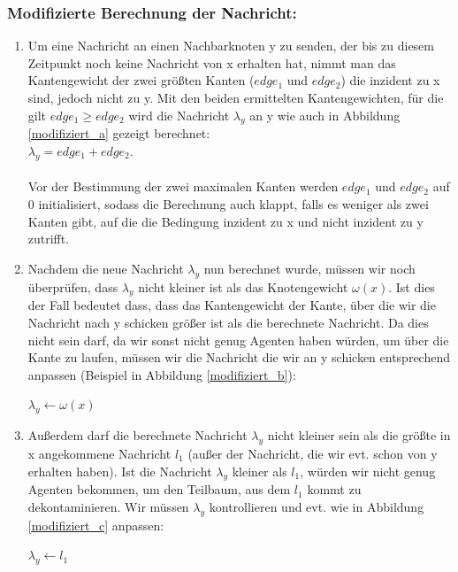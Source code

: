 \subsubsection{Modifizierte Berechnung der Nachricht:}

\begin{enumerate}[label=\alph*)]
	
	\item 
		Um eine Nachricht an einen Nachbarknoten y zu senden, der bis zu diesem Zeitpunkt noch keine Nachricht von x erhalten hat, nimmt man das Kantengewicht der zwei größten Kanten ($edge_{1}$ und $edge_{2}$) die inzident zu x sind, jedoch nicht zu y. Mit den beiden ermittelten Kantengewichten, für die gilt $edge_{1} \ge edge_{2}$ wird die Nachricht $\lambda_{y}$ an y wie auch in Abbildung \ref{modifiziert_a} gezeigt berechnet:\\
		$\lambda_{y} = edge_{1} + edge_{2}$.
		\\
		\\
		Vor der Bestimmung der zwei maximalen Kanten werden $edge_{1}$ und $edge_{2}$ auf 0 initialisiert, sodass die Berechnung auch klappt, falls es weniger als zwei Kanten gibt, auf die die Bedingung inzident zu x und nicht inzident zu y  zutrifft.
	
	\item
		Nachdem die neue Nachricht $\lambda_{y}$ nun berechnet wurde, müssen wir noch überprüfen, dass $\lambda_{y}$ nicht kleiner ist als das Knotengewicht $\omega(x)$. Ist dies der Fall bedeutet dass, dass das Kantengewicht der Kante, über die wir die Nachricht nach y schicken größer ist als die berechnete Nachricht. Da dies nicht sein darf, da wir sonst nicht genug Agenten haben würden, um über die Kante zu laufen, müssen wir die Nachricht die wir an y schicken entsprechend anpassen (Beispiel in Abbildung \ref{modifiziert_b}):
		
		\begin{algorithmic}
			\State $\lambda_{y} \gets \omega(x)$
			\EndIf
		\end{algorithmic}
	
	\item
		Außerdem darf die berechnete Nachricht $\lambda_{y}$ nicht kleiner sein als die größte in x angekommene Nachricht $l_{1}$ (außer der Nachricht, die wir evt. schon von y erhalten haben). Ist die Nachricht $\lambda_{y}$ kleiner als $l_{1}$, würden wir nicht genug Agenten bekommen, um den Teilbaum, aus dem $l_{1}$ kommt zu dekontaminieren. Wir müssen $\lambda_{y}$ kontrollieren und evt. wie in Abbildung \ref{modifiziert_c} anpassen:
		
		\begin{algorithmic}
			\If {$\lambda_{y} \leq l_{1}$}
			\State $\lambda_{y} \gets l_{1}$
			\EndIf
		\end{algorithmic}
	
\end{enumerate}

